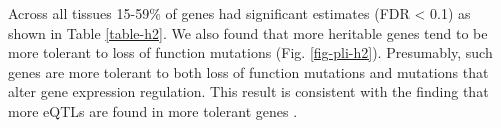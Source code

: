 \documentclass[10pt,letterpaper]{article}
\begin{document}
Across all tissues 15-59\% of genes had significant estimates (FDR \textless{} 0.1)  as shown in Table \ref{table-h2}. %
We also found that more heritable genes tend to be more tolerant to loss of function mutations (Fig. \ref{fig-pli-h2}). Presumably, such genes are more tolerant to both loss of function mutations and mutations that alter gene expression regulation. This result is consistent with the finding that more eQTLs are found in more tolerant genes \cite{lek2016analysis}.
\end{document}
